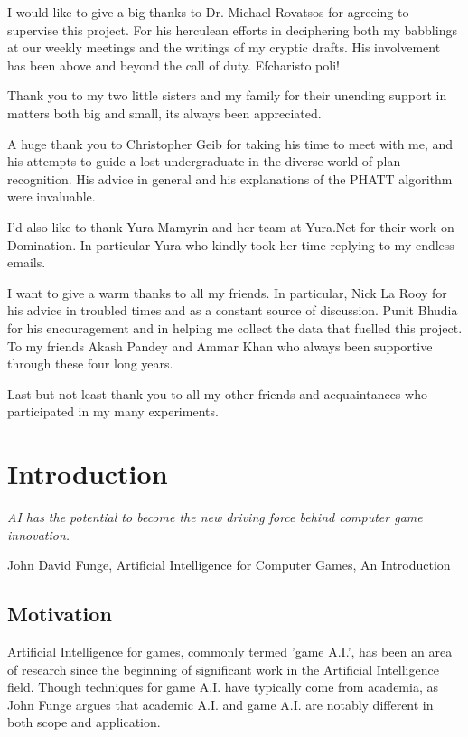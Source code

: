 \documentclass[parskip]{cs4rep}
\begin{document}
I would like to give a big thanks to Dr. Michael Rovatsos for agreeing to supervise this project. For his herculean efforts in deciphering both my babblings at our weekly meetings and the writings of my cryptic drafts. His involvement has been above and beyond the call of duty. Efcharisto poli!

Thank you to my two little sisters and my family for their unending support in matters both big and small, its always been appreciated. 

A huge thank you to Christopher Geib for taking his time to meet with me, and his attempts to guide a lost undergraduate in the diverse world of plan recognition. His advice in general and his explanations of the PHATT algorithm were invaluable. 

I'd also like to thank Yura Mamyrin and her team at Yura.Net for their work on Domination. In particular Yura who kindly took her time replying to my endless emails.

I want to give a warm thanks to all my friends. In particular, Nick La Rooy for his advice in troubled times and as a constant source of discussion. Punit Bhudia for his encouragement and in helping me collect the data that fuelled this project. To my friends Akash Pandey and Ammar Khan who always been supportive through these four long years. 

Last but not least thank you to all my other friends and acquaintances who participated in my many experiments.

\tableofcontents


\chapter{Introduction}

\begin{flushleft}
\textit{AI has the potential to become the new driving force behind computer game innovation.}
\end{flushleft}
\begin{flushleft}
John David Funge, Artificial Intelligence for Computer Games, An Introduction
\end{flushleft}

\section{Motivation}

Artificial Intelligence for games, commonly termed 'game A.I.', has been an area of research since the beginning of significant work in the Artificial Intelligence field. Though techniques for game A.I. have typically come from academia, as John Funge argues \cite{JohnFunge:AIForComp} that academic A.I. and game A.I. are notably different in both scope and application.
\end{document}
